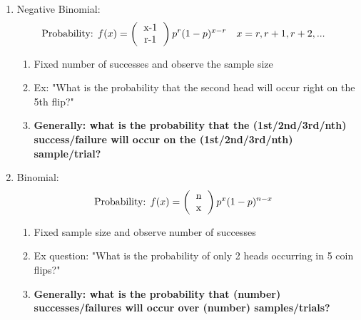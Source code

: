 \documentclass[../INDE315.tex]{subfiles}
\begin{document}
\begin{enumerate}
    \item Negative Binomial:
        \begin{equation*}
            \begin{aligned}
                \text{Probability: } & f(x) = \left( \begin{tabular}{c}
                    x-1 \\
                    r-1
                    \end{tabular}  \right) p^r (1-p)^{x-r} \quad x = r,r + 1, r + 2,... 
            \end{aligned}
        \end{equation*}
        \begin{enumerate}
            \item Fixed number of successes and observe the sample size
            \item Ex: "What is the probability that the second head will occur right on the 5th flip?"
            \item \textbf{Generally: what is the probability that the (1st/2nd/3rd/nth) success/failure will occur on the (1st/2nd/3rd/nth) sample/trial?}
        \end{enumerate}
    \item Binomial: 
        \begin{equation*}
            \begin{aligned}
                \text{Probability: } &  f(x) = \left( \begin{tabular}{c}
                    n \\
                    x
                    \end{tabular}  \right) p^x (1 - p)^{n-x} 
            \end{aligned}
        \end{equation*}
        \begin{enumerate}
            \item Fixed sample size and observe number of successes
            \item Ex question: "What is the probability of only 2 heads occurring in 5 coin flips?"
            \item \textbf{Generally: what is the probability that (number) successes/failures will occur over (number) samples/trials?}
        \end{enumerate}
\end{enumerate}
\end{document}
